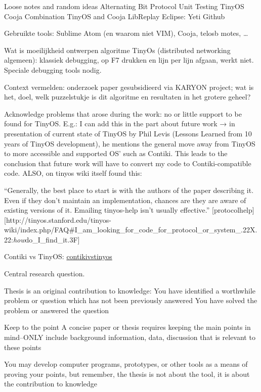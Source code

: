 Loose notes and random ideas Alternating Bit Protocol Unit Testing
TinyOS Cooja Combination TinyOS and Cooja LibReplay Eclipse: Yeti Github

Gebruikte tools: Sublime Atom (en waarom niet VIM), Cooja, telosb motes,
\ldots{}

Wat is moeilijkheid ontwerpen algoritme TinyOs (distributed networking
algemeen): klassiek debugging, op F7 drukken en lijn per lijn afgaan,
werkt niet. Speciale debugging tools nodig.

Context vermelden: onderzoek paper gesubsidieerd via KARYON project; wat
is het, doel, welk puzzelstukje is dit algoritme en resultaten in het
grotere geheel?

Acknowledge problems that arose during the work: no or little support to
be found for TinyOS. E.g.: I can add this in the part about future work
→ in presentation of current state of TinyOS by Phil Levis (Lessons
Learned from 10 years of TinyOS development), he mentions the general
move away from TinyOS to more accessible and supported OS' such as
Contiki. This leads to the conclusion that future work will have to
convert my code to Contiki-compatible code. ALSO, on tinyos wiki itself
found this:

``Generally, the best place to start is with the authors of the paper
describing it. Even if they don't maintain an implementation, chances
are they are aware of existing versions of it. Emailing tinyos-help
isn't usually effective.''
{[}protocolhelp{]}{[}http://tinyos.stanford.edu/tinyos-wiki/index.php/FAQ\#I\_am\_looking\_for\_code\_for\_protocol\_or\_system\_.22X.22:\emph{how}do\_I\_find\_it.3F{]}

Contiki vs TinyOS:
\href{https://www.millennium.berkeley.edu/pipermail/tinyos-help/2010-November/048751.html}{contikivstinyos}

Central research question.

Thesis is an original contribution to knowledge: You have identified a
worthwhile problem or question which has not been previously answered
You have solved the problem or answered the question

Keep to the point A concise paper or thesis requires keeping the main
points in mind--ONLY include background information, data, discussion
that is relevant to these points

You may develop computer programs, prototypes, or other tools as a means
of proving your points, but remember, the thesis is not about the tool,
it is about the contribution to knowledge

